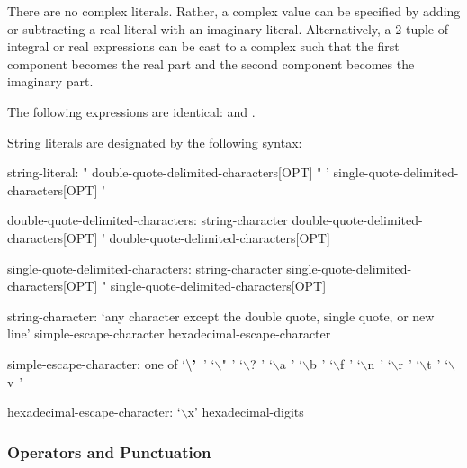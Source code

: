 There are no complex literals.  Rather, a complex value can be
specified by adding or subtracting a real literal with an imaginary
literal.  Alternatively, a 2-tuple of integral or real expressions can
be cast to a complex such that the first component becomes the real
part and the second component becomes the imaginary part.
\begin{example}
The following expressions are identical: 
and .
\end{example}

String literals are designated by the following syntax:
\begin{syntax}
string-literal:
  " double-quote-delimited-characters[OPT] "
  ' single-quote-delimited-characters[OPT] '

double-quote-delimited-characters:
  string-character double-quote-delimited-characters[OPT]
  ' double-quote-delimited-characters[OPT]

single-quote-delimited-characters:
  string-character single-quote-delimited-characters[OPT]
  " single-quote-delimited-characters[OPT]

string-character:
  `any character except the double quote, single quote, or new line'
  simple-escape-character
  hexadecimal-escape-character

simple-escape-character: one of
  `$\backslash\mbox{\bf '}\hspace{5pt}$' `$\backslash$"$\hspace{5pt}$' `$\backslash$?$\hspace{5pt}$' `$\backslash$a$\hspace{5pt}$' `$\backslash$b$\hspace{5pt}$' `$\backslash$f$\hspace{5pt}$' `$\backslash$n$\hspace{5pt}$' `$\backslash$r$\hspace{5pt}$' `$\backslash$t$\hspace{5pt}$' `$\backslash$v$\hspace{5pt}$'

hexadecimal-escape-character:
  `$\backslash$x' hexadecimal-digits
\end{syntax}

\subsubsection{Operators and Punctuation}
\label{Operators_and_Punctuation}

